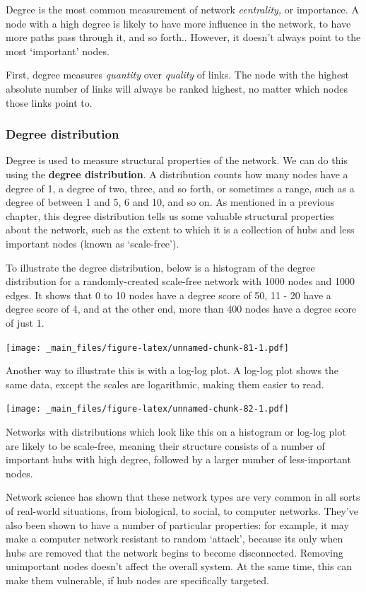\documentclass[
]{book}
\begin{document}
Degree is the most common measurement of network \emph{centrality,} or importance. A node with a high degree is likely to have more influence in the network, to have more paths pass through it, and so forth.. However, it doesn't always point to the most `important' nodes.

First, degree measures \emph{quantity} over \emph{quality} of links. The node with the highest absolute number of links will always be ranked highest, no matter which nodes those links point to.

\hypertarget{degree-distribution}{%
\subsubsection{Degree distribution}\label{degree-distribution}}

Degree is used to measure structural properties of the network. We can do this using the \textbf{degree distribution}. A distribution counts how many nodes have a degree of 1, a degree of two, three, and so forth, or sometimes a range, such as a degree of between 1 and 5, 6 and 10, and so on. As mentioned in a previous chapter, this degree distribution tells us some valuable structural properties about the network, such as the extent to which it is a collection of hubs and less important nodes (known as `scale-free').

To illustrate the degree distribution, below is a histogram of the degree distribution for a randomly-created scale-free network with 1000 nodes and 1000 edges. It shows that 0 to 10 nodes have a degree score of 50, 11 - 20 have a degree score of 4, and at the other end, more than 400 nodes have a degree score of just 1.

\texttt{[image: \_main\_files/figure-latex/unnamed-chunk-81-1.pdf]}

Another way to illustrate this is with a log-log plot. A log-log plot shows the same data, except the scales are logarithmic, making them easier to read.

\texttt{[image: \_main\_files/figure-latex/unnamed-chunk-82-1.pdf]}

Networks with distributions which look like this on a histogram or log-log plot are likely to be scale-free, meaning their structure consists of a number of important hubs with high degree, followed by a larger number of less-important nodes.

Network science has shown that these network types are very common in all sorts of real-world situations, from biological, to social, to computer networks. They've also been shown to have a number of particular properties: for example, it may make a computer network resistant to random `attack', because its only when hubs are removed that the network begins to become disconnected. Removing unimportant nodes doesn't affect the overall system. At the same time, this can make them vulnerable, if hub nodes are specifically targeted.
\end{document}
